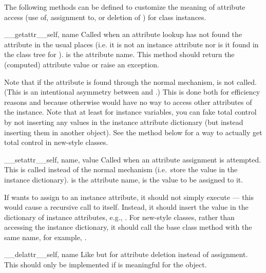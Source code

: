 The following methods can be defined to customize the meaning of
attribute access (use of, assignment to, or deletion of )
for class instances.

\begin{methoddesc}[object]{__getattr__}{self, name}
Called when an attribute lookup has not found the attribute in the
usual places (i.e. it is not an instance attribute nor is it found in
the class tree for ).   is the attribute name.
This method should return the (computed) attribute value or raise an
 exception.

Note that if the attribute is found through the normal mechanism,
 is not called.  (This is an intentional
asymmetry between  and .)
This is done both for efficiency reasons and because otherwise
 would have no way to access other attributes of
the instance.  Note that at least for instance variables, you can fake
total control by not inserting any values in the instance attribute
dictionary (but instead inserting them in another object).  See the
 method below for a way to actually get
total control in new-style classes.
\end{methoddesc}

\begin{methoddesc}[object]{__setattr__}{self, name, value}
Called when an attribute assignment is attempted.  This is called
instead of the normal mechanism (i.e.\ store the value in the instance
dictionary).   is the attribute name,  is the
value to be assigned to it.

If  wants to assign to an instance attribute, it 
should not simply execute  --- this
would cause a recursive call to itself.  Instead, it should insert the
value in the dictionary of instance attributes, e.g.,
.  For new-style classes,
rather than accessing the instance dictionary, it should call the base
class method with the same name, for example,
.
\end{methoddesc}

\begin{methoddesc}[object]{__delattr__}{self, name}
Like  but for attribute deletion instead of
assignment.  This should only be implemented if  is meaningful for the object.
\end{methoddesc}

